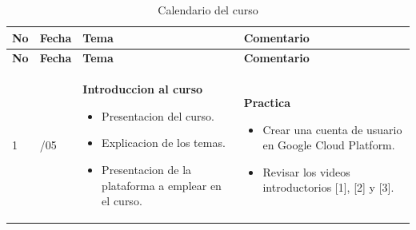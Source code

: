 \documentclass[
  coursetitle={Cómputo Nube y Tecnologías Emergentes},
  coursehours={96},
  coursedate={Verano 2026},
  doctype={Guía del curso},
  otherlangs={english,french},
  authorname={Lázaro},
  authorsurname={Bustio-Martínez},
  authortitle={PhD},
  role={Profesor Investigador},
  email={lbustio@inaoe.mx},
  phone={5559504000},
  ext={7459},
  institution={Instituto Nacional de Astrofísica, Óptica y Electrónica (INAOE)},
  department={Maestría en Ciencias en Tecnologías de Seguridad},
  address={Luis Enrique Erro 1, Sta. Ma. Tonantzintla, San Andrés Cholula, CP 72840, Puebla, México},
  margin={0.5in}
]{lbustio_lecture_notes}
\begin{document}
\setlength{\LTleft}{0pt}
\setlength{\LTright}{0pt}
\begin{longtable}{|
  >{\centering\arraybackslash}p{}|
  >{\centering\arraybackslash}p{}|
  >{\raggedright\arraybackslash}p{}|
  >{\raggedright\arraybackslash}p{}|}
\caption{Calendario del curso}
\label{tab:calendario-curso}
\\
\hline
\textbf{No} & \textbf{Fecha} & \textbf{Tema} & \textbf{Comentario} \\
\hline
\endfirsthead

\hline
\textbf{No} & \textbf{Fecha} & \textbf{Tema} & \textbf{Comentario} \\
\hline
\endhead

\hline
\endfoot

1 & 11/05 &
\textbf{Introduccion al curso}
\begin{itemize}
\item Presentacion del curso.
\item Explicacion de los temas.
\item Presentacion de la plataforma a emplear en el curso.
\end{itemize}
&
\textbf{Practica}
\begin{itemize}
\item Crear una cuenta de usuario en Google Cloud Platform.
\item Revisar los videos introductorios [1], [2] y [3].
\end{itemize}
\\
\hline


\end{longtable}
\end{document}
